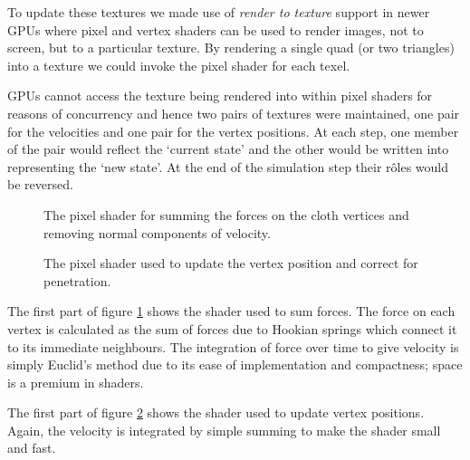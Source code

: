 To update these textures we made use of \emph{render to texture} support in newer GPUs
where pixel and vertex shaders can be used to render images, not to screen, but to
a particular texture. By rendering a single quad (or two triangles) into a texture
we could invoke the pixel shader for each texel.

GPUs cannot access the texture being rendered into within pixel shaders for
reasons of concurrency and hence two pairs of textures were maintained, one pair
for the velocities and one pair for the vertex positions. At each step, one
member of the pair would reflect the `current state' and the other would be
written into representing the `new state'. At the end of the simulation step
their r\^oles would be reversed.


\begin{figure}[p]
\centering
\scalebox{0.7}{
\begin{minipage}{\textwidth}
\singlespacing

\end{minipage}}
\caption{\label{fig:calcForces}The pixel shader for summing the forces on the cloth vertices
and removing normal components of velocity.}
\end{figure}

\begin{figure}[p]
\centering
\scalebox{0.7}{
\begin{minipage}{\textwidth}
\singlespacing

\end{minipage}}
\caption{\label{fig:calcVertices}The pixel shader used to update the vertex position and
correct for penetration.}
\end{figure}

The first part of figure \ref{fig:calcForces} shows the shader used to sum forces. The force
on each vertex is calculated as the sum of forces due to Hookian springs which connect it
to its immediate neighbours. The integration of force over time to give velocity
is simply Euclid's method due to its ease of implementation and compactness; space is a premium
in shaders.

The first part of figure \ref{fig:calcVertices} shows the shader used to update vertex positions.
Again, the velocity is integrated by simple summing to make the shader small and fast.


